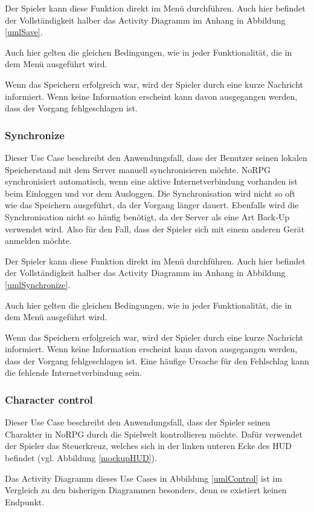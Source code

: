 			Der Spieler kann diese Funktion direkt im Menü durchführen. Auch hier befindet der Vollständigkeit halber das Activity Diagramm im Anhang in Abbildung \ref{umlSave}.
		
			Auch hier gelten die gleichen Bedingungen, wie in jeder Funktionalität, die in dem Menü ausgeführt wird. 
		
			Wenn das Speichern erfolgreich war, wird der Spieler durch eine kurze Nachricht informiert. Wenn keine Information erscheint kann davon ausgegangen werden, dass der Vorgang fehlgeschlagen ist.
		
		\subsubsection{Synchronize}
			Dieser Use Case beschreibt den Anwendungsfall, dass der Benutzer seinen lokalen Speicherstand mit dem Server manuell synchronisieren möchte. NoRPG synchronisiert automatisch, wenn eine aktive Internetverbindung vorhanden ist beim Einloggen und vor dem Ausloggen. Die Synchronisation wird nicht so oft wie das Speichern ausgeführt, da der Vorgang länger dauert. Ebenfalls wird die Synchronisation nicht so häufig benötigt, da der Server als eine Art Back-Up verwendet wird. Also für den Fall, dass der Spieler sich mit einem anderen Gerät anmelden möchte.
			
			Der Spieler kann diese Funktion direkt im Menü durchführen. Auch hier befindet der Vollständigkeit halber das Activity Diagramm im Anhang in Abbildung \ref{umlSynchronize}.
	
			Auch hier gelten die gleichen Bedingungen, wie in jeder Funktionalität, die in dem Menü ausgeführt wird. 
			
			Wenn das Speichern erfolgreich war, wird der Spieler durch eine kurze Nachricht informiert. Wenn keine Information erscheint kann davon ausgegangen werden, dass der Vorgang fehlgeschlagen ist. Eine häufige Ursache für den Fehlschlag kann die fehlende Internetverbindung sein.
		
		\subsubsection{Character control}
			Dieser Use Case beschreibt den Anwendungsfall, dass der Spieler seinen Charakter in NoRPG durch die Spielwelt kontrollieren möchte. Dafür verwendet der Spieler das Steuerkreuz, welches sich in der linken unteren Ecke des HUD befindet (vgl. Abbildung \ref{mockupHUD}).
			
			Das Activity Diagramm dieses Use Cases in Abbildung \ref{umlControl} ist im Vergleich zu den bisherigen Diagrammen besonders, denn es existiert keinen Endpunkt. 
			
